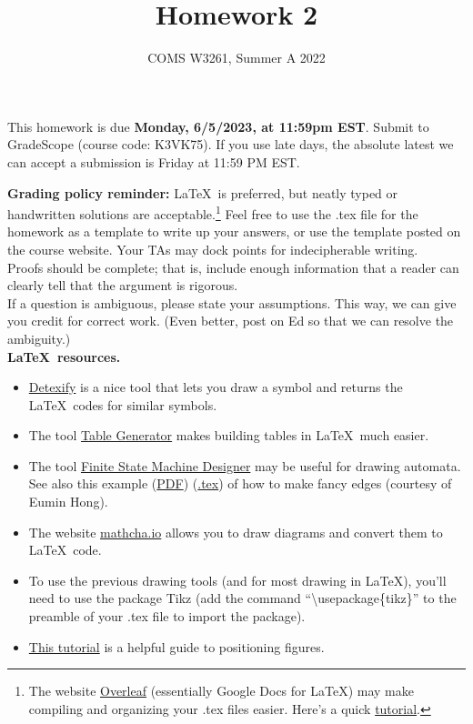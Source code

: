 \documentclass[letterpaper,11pt,twoside]{article}
\title{Homework 2}
\date{COMS W3261, Summer A 2022}
\theoremstyle{plain}
\theoremstyle{definition}
\theoremstyle{remark}
\theoremstyle{restate}
\begin{document}
\maketitle

This homework is due \textbf{Monday, 6/5/2023, at 11:59pm EST}. Submit to GradeScope (course code: K3VK75). If you use late days, the absolute latest we can accept a submission is Friday at 11:59 PM EST.

\textbf{Grading policy reminder:} \LaTeX~is preferred, but neatly typed or handwritten solutions are acceptable.\footnote{The website \href{https://www.overleaf.com/}{Overleaf} (essentially Google Docs for LaTeX) may make compiling and organizing your .tex files easier. Here's a quick \href{https://www.overleaf.com/learn/latex/Learn_LaTeX_in_30_minutes}{tutorial}.} Feel free to use the .tex file for the homework as a template to write up your answers, or use the template posted on the course website. Your TAs may dock points for indecipherable writing.\\

Proofs should be complete; that is, include enough information that a reader can clearly tell that the argument is rigorous. \\

If a question is ambiguous, please state your assumptions. This way, we can give you credit for correct work. (Even better, post on Ed so that we can resolve the ambiguity.) \\

\textbf{\LaTeX~resources.}
\begin{itemize}
    \item \href{https://detexify.kirelabs.org/classify.html}{Detexify} is a nice tool that lets you draw a symbol and returns the \LaTeX~codes for similar symbols. 
    \item The tool \href{https://www.tablesgenerator.com/}{Table Generator} makes building tables in \LaTeX~much easier.
    \item The tool \href{http://madebyevan.com/fsm/}{Finite State Machine Designer} may be useful for drawing automata. See also this example (\href{https://static.us.edusercontent.com/files/HZeTXimODzWeLvHIqsvjL2BG}{PDF}) (\href{https://static.us.edusercontent.com/files/RI3W8tQNvHMWFe9MkXV1KztA}{.tex}) of how to make fancy edges (courtesy of Eumin Hong).
    \item The website \href{https://www.mathcha.io/}{mathcha.io} allows you to draw diagrams and convert them to \LaTeX~code.
    \item To use the previous drawing tools (and for most drawing in \LaTeX), you'll need to use the package Tikz (add the command ``\textbackslash usepackage\{tikz\}'' to the preamble of your .tex file to import the package). 
    \item \href{https://www.overleaf.com/learn/latex/Positioning_of_Figures}{This tutorial} is a helpful guide to positioning figures.
\end{itemize}  
\end{document}
